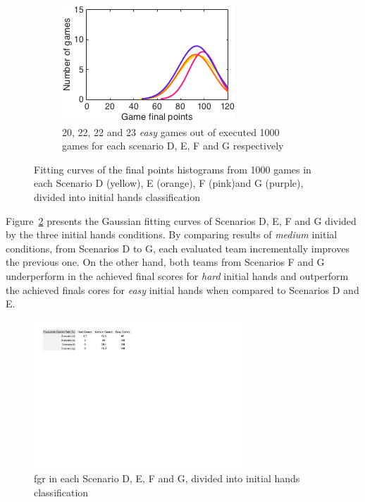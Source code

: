 \begin{figure}[h]
\begin{subfigure}[h]{0.32\textwidth}
                \includegraphics[width=\textwidth]{./img/4/DEFGeasy}
                \caption{20, 22, 22 and 23 \emph{easy} games out of executed 1000 games for each scenario D, E, F and G respectively}
                \label{fig:DEFGeasy}
        \end{subfigure}
        \caption{Fitting curves of the final points histograms from 1000 games in each Scenario D (yellow), E (orange), F (pink)and G (purple), divided into initial hands classification}
        \label{fig:DEFG-CH}
\end{figure}

Figure~\ref{fig:DEFG-CH} presents the Gaussian fitting curves of Scenarios D, E, F and G divided by the three initial hands conditions.
By comparing results of \emph{medium} initial conditions, from Scenarios D to G, each evaluated team incrementally improves the previous one.
On the other hand, both teams from Scenarios F and G underperform in the achieved final scores for \emph{hard} initial hands and outperform the achieved finals cores for \emph{easy} initial hands when compared to Scenarios D and E.

\begin{figure}[h!]
  \centering
    \includegraphics[width=0.7\textwidth]{./img/4/DEFG-fgr}
  \caption{\ac{fgr} in each Scenario D, E, F and G, divided into initial hands classification}
\label{fig:DEFG-fgr}
\end{figure}

